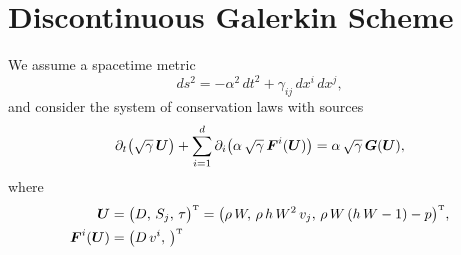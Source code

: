 \section{Discontinuous Galerkin Scheme}
\label{sec:dgMethod}

We assume a spacetime metric
\begin{equation}
  ds^{2}=-\alpha^{2}\,dt^{2}+\gamma_{ij}\,dx^{i}\,dx^{j},
\end{equation}
and consider the system of conservation laws with sources
\begin{equation}
  \partial_{t}{}\big(\sqrt{\gamma}\,\boldsymbol{U}\big)+\sum_{i=1}^{d}\partial_{i}{}\big(\alpha\,\sqrt{\gamma}\,\boldsymbol{F}^{i}(\boldsymbol{U})\big)=\alpha\,\sqrt{\gamma}\,\boldsymbol{G}(\boldsymbol{U}),
  \label{eq:conservationLaws}
\end{equation}
where
\begin{align}
  \boldsymbol{U}
  &=\big(D,\,S_{j},\,\tau\big)^{\mbox{\tiny T}}
  =\big(\rho\,W,\,\rho\,h\,W^{2}\,v_{j},\,\rho\,W\left(h\,W-1\right)-p\big)^{\mbox{\tiny T}}, \\
  \boldsymbol{F}^{i}(\boldsymbol{U})
  &=\big(D\,v^{i},\,\big)^{\mbox{\tiny T}}
\end{align}
